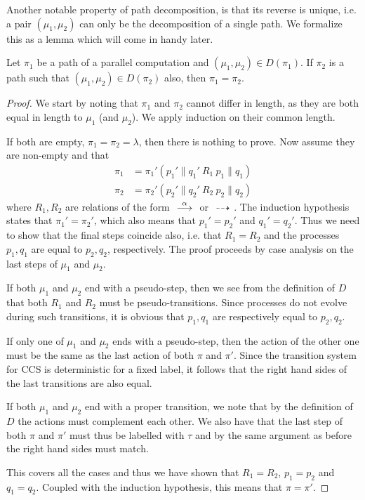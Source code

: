 Another notable property of path decomposition, is that its reverse is unique, i.e.
a pair $(\mu_1,\mu_2)$ can only be the decomposition of a single path. We formalize
this as a lemma which will come in handy later.
\begin{lemma}\label{thm:paths_compose_uniquely}
    Let $\pi_1$ be a path of a parallel computation and $(\mu_1,\mu_2)\in D(\pi_1)$. 
    If $\pi_2$ is a path such
    that $(\mu_1,\mu_2)\in D(\pi_2)$ also, then $\pi_1=\pi_2$.
\end{lemma}
\begin{proof}
    We start by noting that $\pi_1$ and $\pi_2$ cannot differ in length, as they
    are both equal in length to $\mu_1$ (and $\mu_2$). We apply induction on
    their common length.

    If both are empty, $\pi_1=\pi_2=\lambda$, then there is nothing to prove.
    Now assume they are non-empty and that
    \begin{align*}
        \pi_1 &= \pi_1' (p_1' \parallel q_1' \ R_1\  p_1 \parallel q_1) \\
        \pi_2 &= \pi_2' (p_2' \parallel q_2' \ R_2\  p_2 \parallel q_2)
    \end{align*}
    where $R_1,R_2$ are relations of the form $\ {\stackrel{{\alpha}}{\longrightarrow}}\ $ or $\ {\stackrel{_{}}{\dashrightarrow}}\ $.
    The induction hypothesis states that $\pi_1' = \pi_2'$, which also means
    that $p_1'=p_2'$ and $q_1'=q_2'$. Thus we need to show
    that the final steps coincide also, i.e. that $R_1=R_2$ and the processes
    $p_1, q_1$ are equal to $p_2,q_2$, respectively.
    The proof proceeds by case analysis on the last steps of $\mu_1$ and $\mu_2$.

    If both $\mu_1$ and $\mu_2$ end with a pseudo-step, then we see from the definition
    of $D$ that both $R_1$ and $R_2$ must be pseudo-transitions. Since processes do
    not evolve during such transitions, it is obvious that $p_1,q_1$ are respectively
    equal to $p_2,q_2$.

    If only one of $\mu_1$ and $\mu_2$ ends with a pseudo-step, then the action
    of the other one must be the same as the last action of both $\pi$ and $\pi'$.
    Since the transition system for CCS is deterministic for a fixed label, it
    follows that the right hand sides of the last transitions are also equal.

    If both $\mu_1$ and $\mu_2$ end with a proper transition, we note that by
    the definition of $D$ the actions must complement each other. We also have
    that the last step of both $\pi$ and $\pi'$ must thus be labelled with $\tau$
    and by the same argument as before the right hand sides must match.

    This covers all the cases and thus we have shown that $R_1=R_2$, $p_1=p_2$
    and $q_1=q_2$. Coupled with the induction hypothesis, this means that $\pi=\pi'$.
\end{proof}

